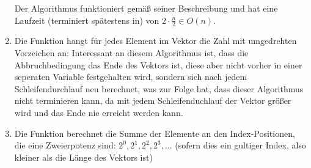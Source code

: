 \documentclass{article}
\begin{document}
\begin{enumerate}[label=(\alph*)]
		Der Algorithmus funktioniert gemäß seiner Beschreibung und hat eine Laufzeit (terminiert spätestens in) von $2 \cdot \frac{n}{2} \in O(n)$.

		\item Die Funktion hangt für jedes Element im Vektor die Zahl mit umgedrehten Vorzeichen an:
		\newline\newline
		Interessant an diesem Algorithmus ist, dass die Abbruchbedingung das Ende des Vektors ist, diese aber nicht vorher in einer seperaten Variable festgehalten wird, sondern sich
		nach jedem Schleifendurchlauf neu berechnet, was zur Folge hat, dass dieser Algorithmus nicht terminieren kann, da mit jedem Schleifenduchlauf der Vektor größer wird und das Ende
		nie erreicht werden kann.

		\item Die Funktion berechnet die Summe der Elemente an den Index-Positionen, die eine Zweierpotenz
		sind: $2^0, 2^1, 2^2, 2^3, ...$ (sofern dies ein gultiger Index, also kleiner als die Länge des Vektors ist)


    \end{enumerate}
\end{document}
